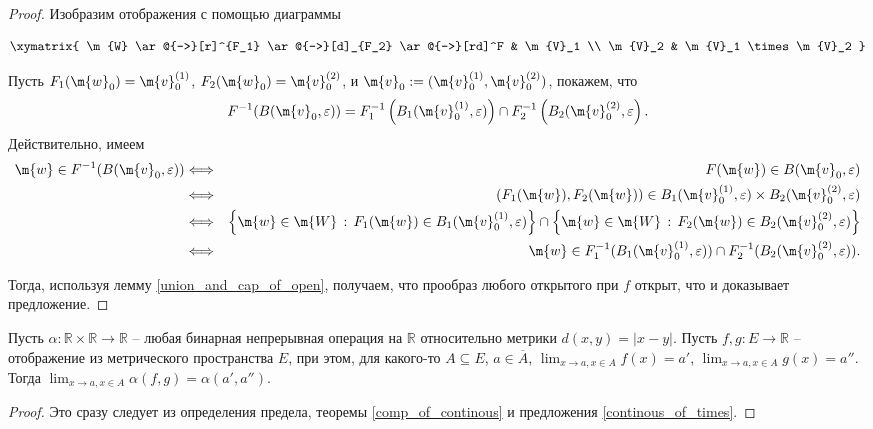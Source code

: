 \begin{proof}

Изобразим отображения с помощью диаграммы

\[
 \xymatrix{
 \m{W} \ar@{->}[r]^{F_1} \ar@{->}[d]_{F_2} \ar@{->}[rd]^F & \m{V}_1 \\
 \m{V}_2 & \m{V}_1 \times \m{V}_2
 }
\]

Пусть $F_1(\m{w}_0) = \m{v}_0^{(1)}$, $F_2(\m{w}_0) = \m{v}_0^{(2)}$, и $\m{v}_0: = (\m{v}_0^{(1)}, \m{v}_0^{(2)})$, покажем, что 
 \[
  F^{-1} (B(\m{v}_0, \varepsilon)) = F_1^{-1}\left(B_1( \m{v}_0^{(1)} , \varepsilon)\right) \cap F_2^{-1}\left( B_2(\m{v}_0^{(2)}, \varepsilon \right).
  \]
Действительно, имеем
\begin{eqnarray*}
  \m{w} \in F^{-1} (B(\m{v}_0, \varepsilon)) &\Longleftrightarrow&  F(\m{w}) \in B(\m{v}_0,\varepsilon) \\
   &\Longleftrightarrow& \left(F_1(\m{w}), F_2(\m{w}) \right) \in B_1(\m{v}_0^{(1)}, \varepsilon) \times B_2(\m{v}_0^{(2)}, \varepsilon) \\
   &\Longleftrightarrow & \Bigl\{ \m{w} \in \m{W}\,:\, F_1(\m{w}) \in B_1(\m{v}_0^{(1)}, \varepsilon) \Bigr\} \cap  \Bigl\{ \m{w}\in \m{W} \, :\, F_2(\m{w}) \in B_2(\m{v}_0^{(2)}, \varepsilon) \Bigr\} \\
   &\Longleftrightarrow& \m{w} \in F_1^{-1}(B_1(\m{v}_0^{(1)}, \varepsilon)) \cap F_2^{-1}(B_2(\m{v}_0^{(2)}, \varepsilon)).
\end{eqnarray*}

Тогда, используя лемму \ref{union_and_cap_of_open}, получаем, что прообраз любого открытого при $f$ открыт, что и доказывает предложение.
\end{proof}

\begin{theorem}
    Пусть $\alpha: \mathbb{R} \times \mathbb{R} \to \mathbb{R}$ -- любая бинарная непрерывная операция на $\mathbb{R}$ относительно метрики $d(x,y) = |x-y|$. Пусть $f,g:E \to \mathbb{R}$ -- отображение из метрического пространства $E$, при этом, для какого-то $A \subseteq E$, $a\in \overline{A}$, $\lim_{x\to a, x \in A}f(x) = a'$, $\lim_{x\to a, x \in A}g(x) = a''$. Тогда $\lim_{x\to a, x \in A}\alpha(f,g) = \alpha(a',a'').$
\end{theorem}

\begin{proof}
    Это сразу следует из определения предела, теоремы \ref{comp_of_continous} и предложения \ref{continous_of_times}.
\end{proof}


